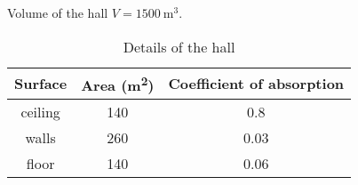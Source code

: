 \documentclass{article}
\begin{document}
\blindtext

Volume of the hall \(V = \SI{1500}{\cubic\metre}\).

\vspace{2cm}

\begin{table}[h]
    \centering
    \begin{tabular}{ccS}
        \toprule
        Surface & Area (\si{\metre\squared}) & {Coefficient of absorption}\\
        \midrule
        ceiling & 140 & 0.8 \\
        walls & 260 & 0.03 \\
        floor & 140 & 0.06 \\
    \bottomrule
    \end{tabular}
    \caption{Details of the hall}
\end{table}

\blindtext
\end{document}
